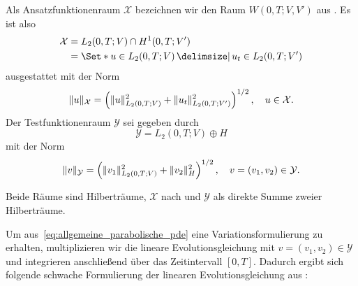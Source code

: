 \begin{Definition}
\label{definition:gl:ansatz_und_testraum}
    Als Ansatzfunktionenraum $\mathcal X$ bezeichnen wir den Raum $W(0, T; V, V')$ aus .
    Es ist also
    \begin{equation}
        \label{eq:var_all_ansatzraum_x}
        \begin{aligned}
            \mathcal X &= L_{2}(0, T; V) \cap H^{1}(0, T; V')
            \\&= \Set*{ u \in L_{2}(0, T; V) \given u_{t} \in L_{2}(0, T; V') }
        \end{aligned}
    \end{equation}
    ausgestattet mit der Norm
    \begin{equation}
        \label{eq:var_all_ansatzraum_x_norm}
        \lVert u\rVert_{\mathcal X} = \left( \lVert u\rVert_{L_{2}{(0, T; V)}}^{2} + \lVert u_{t}\rVert_{L_{2}{(0, T; V')}}^{2} \right)^{1 / 2}, \quad u \in \mathcal X.
    \end{equation}
    Der Testfunktionenraum $\mathcal Y$ sei gegeben durch
    \begin{equation}
        \label{eq:var_all_testraum_y}
        \mathcal Y = L_{2}(0, T; V) \oplus H
    \end{equation}
    mit der Norm
    \begin{equation}
        \label{eq:var_all_testraum_y_norm}
        \lVert v\rVert_{\mathcal Y} = \left( \lVert v_{1}\rVert_{L_{2}(0, T; V)}^{2} + \lVert v_{2}\rVert_{H}^{2} \right)^{1 / 2}, \quad v = (v_{1}, v_{2}) \in \mathcal Y.
    \end{equation}
\end{Definition}

Beide Räume sind Hilberträume, $\mathcal X$ nach  und $\mathcal Y$ als direkte Summe zweier Hilberträume.

Um aus~\eqref{eq:allgemeine_parabolische_pde} eine Variationsformulierung zu erhalten, multiplizieren wir die lineare Evolutionsgleichung mit $v = (v_{1}, v_{2}) \in \mathcal Y$ und integrieren anschließend über das Zeitintervall $[0, T]$.
Dadurch ergibt sich folgende schwache Formulierung der linearen Evolutionsgleichung aus :

